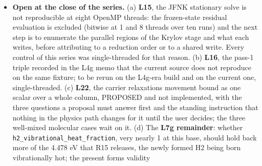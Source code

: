 \documentclass[english,a4paper]{my_memo}
\begin{document}
\begin{itemize}
  and \texttt{eps\_He} 2.0e-2 to 4.6e-2 against the tolerance 5e-2, at k = 4 (eight
  rungs) or k = 5 (He/H 2.09), every iterate \texttt{exhale\_info\ =\ 0}. The XUV grid,
  added after the ladders, spans 0.10 to 0.33 of the reference spectrum at
  He/H 2.13 and 9.7 with the scalar K\_zz and at 9.7 with the profile: log10
  Mdot 6.83, 7.01, 7.14, 7.24 to 7.25, 7.33, 7.37 for the scalar cases and
  6.85, 7.04, 7.18, 7.28, 7.36, 7.40 for the profile ones, against 7.88 and
  7.87 (scalar, He/H 2.13 and 9.7) and 7.91 (profile) at the full spectrum.
  Against the archived 2026-08-30 solution of the reference case (K\_zz = 1e9,
  He/H = 1.6261), overlaid by \texttt{models/compare\_archive.py} in
  \texttt{docs/figures/lhs1140b\_wb\_vs\_archive\_kzz1e9.pdf}: red-pair equivalent width
  1.17576 against 1.11635 percent A, red depth 4.34388 against 4.17649
  percent, FWHM 0.2543 against 0.2507 A and log10 Mdot 7.87 against 7.80
  (READ) -\/- +5.3, +4.0 and +1.4 percent and +0.07 dex, measured on 2026-09-13
  before the L6b cooling tables landed. Part of that difference is the
  archived curve\textquotesingle s pre-2026-09-03 transit reader ghost rows. \textbf{Every number of
  this bullet was superseded by the base-boundary correction of item L21};
  what stands now is the re-run bullet above.
\item
  \textbf{Open at the close of the series.} (a) \textbf{L15}, the JFNK stationary solve
  is not reproducible at eight OpenMP threads: the frozen-state residual
  evaluation is excluded (bitwise at 1 and 8 threads over ten runs) and the
  next step is to enumerate the parallel regions of the Krylov stage and what
  each writes, before attributing to a reduction order or to a shared write.
  Every control of this series was single-threaded for that reason. (b)
  \textbf{L16}, the pass-1 triple recorded in the L4g memo that the current source
  does not reproduce on the same fixture; to be rerun on the L4g-era build and
  on the current one, single-threaded. (c) \textbf{L22}, the carrier relaxation\textquotesingle s
  movement bound as one scalar over a whole column, PROPOSED and not
  implemented, with the three questions a proposal must answer first and the
  standing instruction that nothing in the physics path changes for it until
  the user decides; the three well-mixed molecular cases wait on it. (d) The
  \textbf{L7g remainder}: whether \texttt{h2\_vibrational\_heat\_fraction}, very nearly 1 at
  this base, should hold back more of the 4.478 eV that R15 releases, the
  newly formed H2 being born vibrationally hot; the present form\textquotesingle s validity

\end{itemize}
\end{document}
